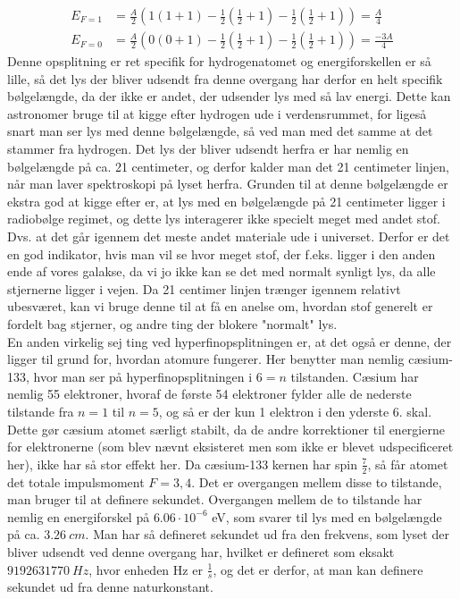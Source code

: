 \documentclass[../../Atom-ogMolekylefysik.tex]{subfiles}
\begin{document}
\begin{align*}
    E_{F=1}&=\frac{A}{2}(1(1+1)-\frac{1}{2}(\frac{1}{2}+1)-\frac{1}{2}(\frac{1}{2}+1))=\frac{A}{4}\\
    E_{F=0}&=\frac{A}{2}(0(0+1)-\frac{1}{2}(\frac{1}{2}+1)-\frac{1}{2}(\frac{1}{2}+1))=\frac{-3A}{4}
\end{align*}
Denne opsplitning er ret specifik for hydrogenatomet og energiforskellen er så lille, så det lys der bliver udsendt fra denne overgang har derfor en helt specifik bølgelængde, da der ikke er andet, der udsender lys med så lav energi. Dette kan astronomer bruge til at kigge efter hydrogen ude i verdensrummet, for ligeså snart man ser lys med denne bølgelængde, så ved man med det samme at det stammer fra hydrogen. Det lys der bliver udsendt herfra er har nemlig en bølgelængde på ca. 21 centimeter, og derfor kalder man det 21 centimeter linjen, når man laver spektroskopi på lyset herfra. Grunden til at denne bølgelængde er ekstra god at kigge efter er, at lys med en bølgelængde på 21 centimeter ligger i radiobølge regimet, og dette lys interagerer ikke specielt meget med andet stof. Dvs. at det går igennem det meste andet materiale ude i universet. Derfor er det en god indikator, hvis man vil se hvor meget stof, der f.eks. ligger i den anden ende af vores galakse, da vi jo ikke kan se det med normalt synligt lys, da alle stjernerne ligger i vejen. Da 21 centimer linjen trænger igennem relativt ubesværet, kan vi bruge denne til at få en anelse om, hvordan stof generelt er fordelt bag stjerner, og andre ting der blokere "normalt" lys.\\

En anden virkelig sej ting ved hyperfinopsplitningen er, at det også er denne, der ligger til grund for, hvordan atomure fungerer.  Her benytter man nemlig cæsium-133, hvor man ser på hyperfinopsplitningen i $6=n$ tilstanden. Cæsium har nemlig 55 elektroner, hvoraf de første 54 elektroner fylder alle de nederste tilstande fra $n=1$ til $n=5$, og så er der kun 1 elektron i den yderste 6. skal. Dette gør cæsium atomet særligt stabilt, da de andre korrektioner til energierne for elektronerne (som blev nævnt eksisteret men som ikke er blevet udspecificeret her), ikke har så stor effekt her. Da cæsium-133 kernen har spin $\frac{7}{2}$, så får atomet det totale impulsmoment $F=3,4$. Det er overgangen mellem disse to tilstande, man bruger til at definere sekundet. Overgangen mellem de to tilstande har nemlig en energiforskel på $6.06\cdot10^{-6}$ eV, som svarer til lys med en bølgelængde på ca. $\SI{3.26}{cm}$. Man har så defineret sekundet ud fra den frekvens, som lyset der bliver udsendt ved denne overgang har, hvilket er defineret som eksakt $\SI{9192631770}{Hz}$, hvor enheden Hz er $\frac{1}{s}$, og det er derfor, at man kan definere sekundet ud fra denne naturkonstant.
\end{document}
